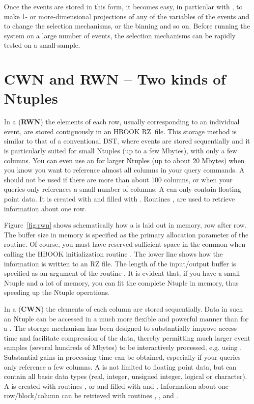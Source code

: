 Once the events are stored in this form, it becomes easy, in
particular with \PAW{},
to make 1- or more-dimensional projections of any of the 
variables of the events and to change the selection
mechanisms, or the binning and so on.
Before running the system on a large
number of events, the selection mechanisms can be rapidly tested
on a small sample.
 
\section{CWN and RWN -- Two kinds of Ntuples}

In a  ({\bf RWN}) the elements of each row, usually
corresponding to an individual event, 
are stored contiguously in an HBOOK RZ~file.
This storage method is similar to that of a conventional
DST, where events are stored sequentially and
it is particularly suited for small Ntuples (up to
a few Mbytes), with only a few columns.
You can even use an \RWN{} for larger Ntuples (up to about 20 Mbytes) when
you know you want to reference almost all columns in your query commands.
A \RWN{} should not be used if there are more than about 100 columns, or
when your queries only references a small number of columns. 
A \RWN{} can only contain floating point data.
It is created with  and filled with . 
Routines
,  are used to retrieve information about one row.

Figure~\ref{fig:rwn} shows schematically how a \RWN{} is laid out in
memory, row after row. The buffer size in memory  is
specified as the primary allocation parameter  of the
 routine. 
Of course, you must have reserved sufficient space in the 
%
 common when calling the HBOOK initialization
routine .
The lower line shows how the information is written to an RZ file.
The length of the input/output buffer  is specified as an
argument of the routine .
%
It is evident that, if you have a small Ntuple and a lot of memory, 
you can fit the complete Ntuple in memory, thus speeding up the 
Ntuple operations.

In a  ({\bf CWN}) the elements of each column are
stored sequentially. 
Data in such an Ntuple can be accessed in a much more flexible
and powerful manner than for a \RWN{}.
The \CWN{} storage mechanism has been designed to substantially improve access time
and facilitate compression of the data, thereby permitting much larger
event samples (several hundreds of Mbytes) to be interactively processed,
e.g. using \PAW.
Substantial gains in processing time can be obtained, especially if 
your queries only reference a few columns.
A \CWN{} is not limited to floating point data, but can contain 
all basic data types (real, integer, unsigned integer, logical or character).
A \CWN{} is created with routines ,  or  and filled
with  and . 
Information about one row/block/column can be retrieved with routines
, ,  and .

